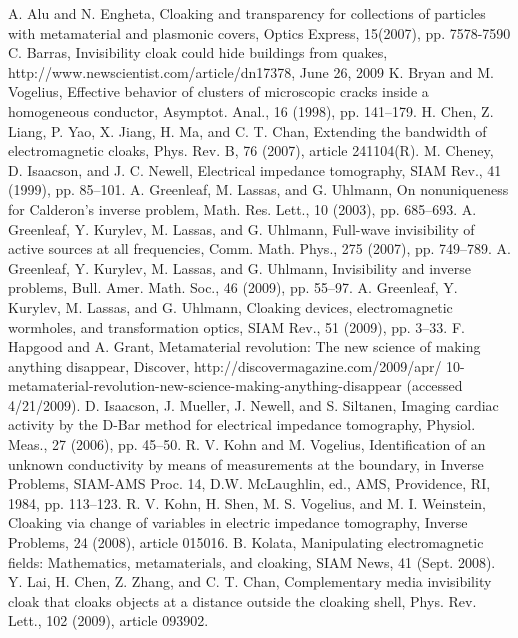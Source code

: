 \documentclass[a4paper, 12pt]{article}
\begin{document}
\begin{thebibliography}{99}
A. Alu and N. Engheta, Cloaking and transparency for collections of
 particles with metamaterial and plasmonic covers, Optics Express, 15(2007), pp.
  7578-7590
C. Barras, Invisibility cloak could hide buildings from quakes,
http://www.newscientist.com/article/dn17378, June 26, 2009
K. Bryan and M. Vogelius, Effective behavior of clusters of microscopic 
cracks inside a homogeneous conductor, Asymptot. Anal., 16 (1998), pp. 141–179.
H. Chen, Z. Liang, P. Yao, X. Jiang, H. Ma, and C. T. Chan, Extending the 
bandwidth of electromagnetic cloaks, Phys. Rev. B, 76 (2007), article 241104(R).
M. Cheney, D. Isaacson, and J. C. Newell, Electrical impedance tomography, 
SIAM Rev., 41 (1999), pp. 85–101.
A. Greenleaf, M. Lassas, and G. Uhlmann, On nonuniqueness for Calderon’s inverse problem, Math. Res. Lett., 10 (2003), pp. 685–693.
A. Greenleaf, Y. Kurylev, M. Lassas, and G. Uhlmann, Full-wave 
invisibility of active sources at all frequencies, Comm. Math. Phys., 275 (2007), pp. 
749–789.
A. Greenleaf, Y. Kurylev, M. Lassas, and G. Uhlmann, Invisibility and 
inverse problems, Bull. Amer. Math. Soc., 46 (2009), pp. 55–97.
A. Greenleaf, Y. Kurylev, M. Lassas, and G. Uhlmann, Cloaking devices, 
electromagnetic wormholes, and transformation optics, SIAM Rev., 51 (2009), pp. 3–33.
F. Hapgood and A. Grant, Metamaterial revolution: The new science of 
making anything disappear, Discover, http://discovermagazine.com/2009/apr/
10-metamaterial-revolution-new-science-making-anything-disappear (accessed 4/21/2009).
D. Isaacson, J. Mueller, J. Newell, and S. Siltanen, Imaging cardiac 
activity by the D-Bar method for electrical impedance tomography, Physiol. Meas., 27 
(2006), pp. 45–50.
R. V. Kohn and M. Vogelius, Identification of an unknown conductivity by 
means of measurements at the boundary, in Inverse Problems, SIAM-AMS Proc. 14, D.W. 
McLaughlin, ed., AMS, Providence, RI, 1984, pp. 113–123.
R. V. Kohn, H. Shen, M. S. Vogelius, and M. I. Weinstein, Cloaking via 
change of variables in electric impedance tomography, Inverse Problems, 24 (2008), 
article 015016.
B. Kolata, Manipulating electromagnetic fields: Mathematics, 
metamaterials, and cloaking, SIAM News, 41 (Sept. 2008).
Y. Lai, H. Chen, Z. Zhang, and C. T. Chan, Complementary media 
invisibility cloak that cloaks objects at a distance outside the cloaking shell, Phys. 
Rev. Lett., 102 (2009), article 093902.

\end{thebibliography}
\end{document}
